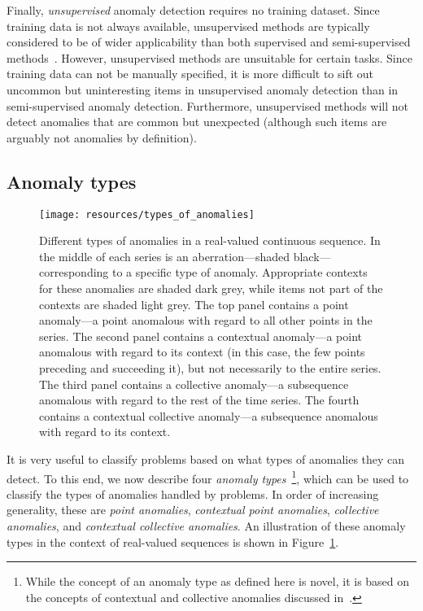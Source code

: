 Finally, \emph{unsupervised} anomaly detection requires no training dataset. Since training data is not always available, unsupervised methods are typically considered to be of wider applicability than both supervised and semi-supervised methods~\cite{chandola}. However, unsupervised methods are unsuitable for certain tasks. Since training data can not be manually specified, it is more difficult to sift out uncommon but uninteresting items in unsupervised anomaly detection than in semi-supervised anomaly detection. Furthermore, unsupervised methods will not detect anomalies that are common but unexpected (although such items are arguably not anomalies by definition).

\subsection{Anomaly types}
\label{sect:anomaly_types}

\begin{figure}[htb]
    \begin{center}
        \texttt{[image: resources/types\_of\_anomalies]}
    \end{center}
    \caption{{\small Different types of anomalies in a real-valued continuous sequence. In the middle of each series is an aberration---shaded black---corresponding to a specific type of anomaly. Appropriate contexts for these anomalies are shaded dark grey, while items not part of the contexts are shaded light grey. The top panel contains a point anomaly---a point anomalous with regard to all other points in the series. The second panel contains a contextual anomaly---a point anomalous with regard to its context (in this case, the few points preceding and succeeding it), but not necessarily to the entire series. The third panel contains a collective anomaly---a subsequence anomalous with regard to the rest of the time series. The fourth contains a contextual collective anomaly---a subsequence anomalous with regard to its context.}}
\label{fig:anomaly_types}
\end{figure}

It is very useful to classify problems based on what types of anomalies they can detect. To this end, we now describe four \emph{anomaly types}~\footnote{While the concept of an anomaly type as defined here is novel, it is based on the concepts of contextual and collective anomalies discussed in~\cite{chandola}.}, which can be used to classify the types of anomalies handled by problems. In order of increasing generality, these are \emph{point anomalies}, \emph{contextual point anomalies}, \emph{collective anomalies}, and \emph{contextual collective anomalies}. An illustration of these anomaly types in the context of real-valued sequences is shown in Figure~\ref{fig:anomaly_types}.

